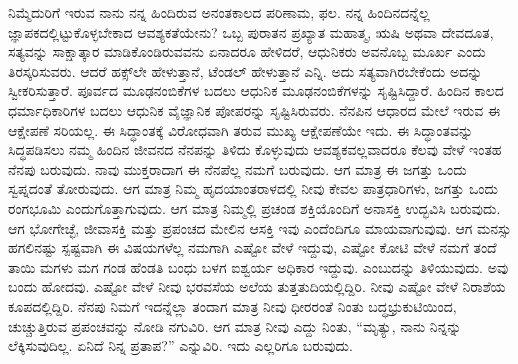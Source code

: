 ನಿಮ್ಮೆದುರಿಗೆ ಇರುವ ನಾನು ನನ್ನ ಹಿಂದಿರುವ ಅನಂತಕಾಲದ ಪರಿಣಾಮ, ಫಲ. ನನ್ನ ಹಿಂದಿನದನ್ನೆಲ್ಲ ಜ್ಞಾಪಕದಲ್ಲಿಟ್ಟುಕೊಳ್ಳಬೇಕಾದ ಆವಶ್ಯಕತೆಯೇನು? ಒಬ್ಬ ಪುರಾತನ ಪ್ರಖ್ಯಾತ ಮಹಾತ್ಮ, ಋಷಿ ಅಥವಾ ದೇವದೂತ, ಸತ್ಯವನ್ನು ಸಾಕ್ಷಾತ್ಕಾರ ಮಾಡಿಕೊಂಡಿರುವವನು ಏನಾದರೂ ಹೇಳಿದರೆ, ಆಧುನಿಕರು ಅವನೊಬ್ಬ ಮೂರ್ಖ ಎಂದು ತಿರಸ್ಕರಿಸುವರು. ಆದರೆ ಹಕ್ಸ್​ಲೇ ಹೇಳುತ್ತಾನೆ, ಟೆಂಡಲ್​ ಹೇಳುತ್ತಾನೆ ಎನ್ನಿ. ಅದು ಸತ್ಯವಾಗಿರಬೇಕೆಂದು ಅದನ್ನು ಸ್ವೀಕರಿಸುತ್ತಾರೆ. ಪೂರ್ವದ ಮೂಢನಂಬಿಕೆಗಳ ಬದಲು ಆಧುನಿಕ ಮೂಢನಂಬಿಕೆಗಳನ್ನು ಸೃಷ್ಟಿಸಿದ್ದಾರೆ. ಹಿಂದಿನ ಕಾಲದ ಧರ್ಮಾಧಿಕಾರಿಗಳ ಬದಲು ಆಧುನಿಕ ವೈಜ್ಞಾನಿಕ ಪೋಪರನ್ನು ಸೃಷ್ಟಿಸಿರುವರು. ನೆನಪಿನ ಆಧಾರದ ಮೇಲೆ ಇರುವ ಈ ಆಕ್ಷೇಪಣೆ ಸರಿಯಲ್ಲ. ಈ ಸಿದ್ಧಾಂತಕ್ಕೆ ವಿರೋಧವಾಗಿ ತರುವ ಮುಖ್ಯ ಆಕ್ಷೇಪಣೆಯೇ ಇದು. ಈ ಸಿದ್ಧಾಂತವನ್ನು ಸಿದ್ಧಪಡಿಸಲು ನಮ್ಮ ಹಿಂದಿನ ಜೀವನದ ನೆನಪನ್ನು ತಿಳಿದು ಕೊಳ್ಳುವುದು ಆವಶ್ಯಕವಲ್ಲವಾದರೂ ಕೆಲವು ವೇಳೆ ಇಂತಹ ನೆನಪು ಬರುವುದು. ನಾವು ಮುಕ್ತರಾದಾಗ ಈ ನೆನಪೆಲ್ಲ ನಮಗೆ ಬರುವುದು. ಆಗ ಮಾತ್ರ ಈ ಜಗತ್ತು ಒಂದು ಸ್ವಪ್ನದಂತೆ ತೋರುವುದು. ಆಗ ಮಾತ್ರ ನಿಮ್ಮ ಹೃದಯಾಂತರಾಳದಲ್ಲಿ ನೀವು ಕೇವಲ ಪಾತ್ರಧಾರಿಗಳು, ಜಗತ್ತು ಒಂದು ರಂಗಭೂಮಿ ಎಂದುಗೊತ್ತಾಗುವುದು. ಆಗ ಮಾತ್ರ ನಿಮ್ಮಲ್ಲಿ ಪ್ರಚಂಡ ಶಕ್ತಿಯೊಂದಿಗೆ ಅನಾಸಕ್ತಿ ಉದ್ಭವಿಸಿ ಬರುವುದು. ಆಗ ಭೋಗೇಚ್ಛೆ, ಜೀವಾಸಕ್ತಿ ಮತ್ತು ಪ್ರಪಂಚದ ಮೇಲಿನ ಆಸಕ್ತಿ ಇವು ಎಂದೆಂದಿಗೂ ಮಾಯವಾಗುವುವು. ಆಗ ಮನಸ್ಸು ಹಗಲಿನಷ್ಟು ಸ್ಪಷ್ಟವಾಗಿ ಈ ವಿಷಯಗಳೆಲ್ಲ ನಮಗಾಗಿ ಎಷ್ಟೋ ವೇಳೆ ಇದ್ದುವು, ಎಷ್ಟೋ ಕೋಟಿ ವೇಳೆ ನಮಗೆ ತಂದೆ ತಾಯಿ ಮಗಳು ಮಗ ಗಂಡ ಹೆಂಡತಿ ಬಂಧು ಬಳಗ ಐಶ್ವರ್ಯ ಅಧಿಕಾರ ಇದ್ದುವು. ಎಂಬುದನ್ನು ತಿಳಿಯುವುದು. ಅವು ಬಂದು ಹೋದವು. ಎಷ್ಟೋ ವೇಳೆ ನೀವು ಭರವಸೆಯ ಅಲೆಯ ತುತ್ತತುದಿಯಲ್ಲಿದ್ದಿರಿ. ನೀವು ಎಷ್ಟೋ ವೇಳೆ ನಿರಾಶೆಯ ಕೂಪದಲ್ಲಿದ್ದಿರಿ. ನೆನಪು ನಿಮಗೆ ಇದನ್ನೆಲ್ಲಾ ತಂದಾಗ ಮಾತ್ರ ನೀವು ಧೀರರಂತೆ ನಿಂತು ಬದ್ಧಭ್ರುಕುಟಿಯಿಂದ, ಚುಚ್ಚುತ್ತಿರುವ ಪ್ರಪಂಚವನ್ನು ನೋಡಿ ನಗುವಿರಿ. ಆಗ ಮಾತ್ರ ನೀವು ಎದ್ದು ನಿಂತು, “ಮೃತ್ಯು, ನಾನು ನಿನ್ನನ್ನು ಲೆಕ್ಕಿಸುವುದಿಲ್ಲ. ಏನಿದೆ ನಿನ್ನ ಪ್ರತಾಪ?” ಎನ್ನುವಿರಿ. ಇದು ಎಲ್ಲರಿಗೂ ಬರುವುದು.

